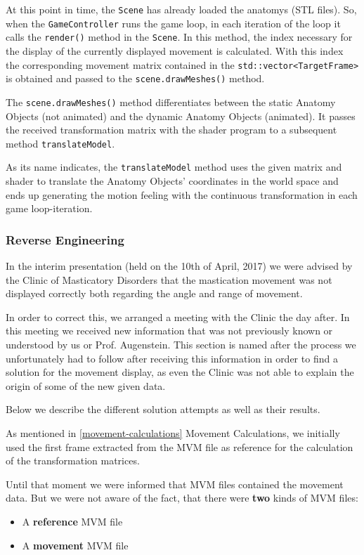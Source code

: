 At this point in time, the \verb|Scene| has already loaded the \glspl{anatomy} (STL files). So, when the \verb|GameController| runs the game loop, in each iteration of the loop it calls the \verb|render()| method in the \verb|Scene|. In this method, the index necessary for the display of the currently displayed movement is calculated. With this index the corresponding movement matrix contained in the \verb|std::vector<TargetFrame>| is obtained and passed to the \verb|scene.drawMeshes()| method.

The \verb|scene.drawMeshes()| method differentiates between the static Anatomy Objects (not animated) and the dynamic Anatomy Objects (animated). It passes the received transformation matrix with the \gls{shader} program to a subsequent method \verb|translateModel|. 

As its name indicates, the \verb|translateModel| method uses the given matrix and shader to translate the Anatomy Objects' coordinates in the world space and ends up generating the motion feeling with the continuous transformation in each game loop-iteration.

\subsubsection{Reverse Engineering} \label{reverse-engineering}

In the interim presentation (held on the 10th of April, 2017) we were advised by the Clinic of Masticatory Disorders that the mastication movement was not displayed correctly both regarding the angle and range of movement.

In order to correct this, we arranged a meeting with the Clinic the day after. In this meeting we received new information that was not previously known or understood by us or Prof. Augenstein. 
This section is named after the process we unfortunately had to follow after receiving this information in order to find a solution for the movement display, as even the Clinic was not able to explain the origin of some of the new given data.

Below we describe the different solution attempts as well as their results. 


As mentioned in \ref{movement-calculations} Movement Calculations, we initially used the first \gls{frame} extracted from the MVM file as reference for the calculation of the transformation matrices. 

Until that moment we were informed that MVM files contained the movement data. But we were not aware of the fact, that there were \textbf{two} kinds of MVM files:
\begin{itemize}
	\item A \textbf{reference} MVM file
	\item A \textbf{movement} MVM file
\end{itemize}

